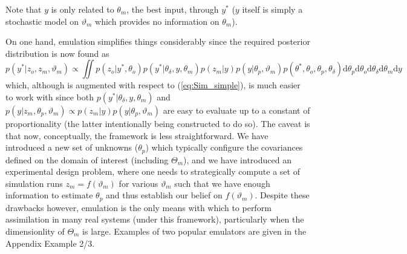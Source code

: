 \documentclass[10pt,a4paper]{article}
\newcommand{\intd} {\textrm{d}}
\begin{document}
\begin{figure}[h!]
\centering
{}
\end{figure}

\noindent Note that $y$ is only related to $\theta_m$, the best input, through $y^*$ ($y$ itself is simply a stochastic model on $\vartheta_m$ which provides no information on $\theta_m$).

On one hand, emulation simplifies things considerably since the required posterior distribution is now found as 
\begin{equation}
p(y^*|z_o,z_m,\vartheta_m) \propto \iint p(z_o | y^*, \theta_o)p(y^* | \theta_\delta, y,\theta_m)p(z_m | y)p(y | \theta_p,\vartheta_m)p(\theta^*,\theta_o, \theta_p, \theta_\delta) \intd \theta_p \intd\theta_o \intd\theta_\delta \intd\theta_m \intd y
\end{equation}
\noindent which, although is augmented with respect to (\ref{eq:Sim_simple}), is much easier to work with since both $p(y^* | \theta_\delta,y,\theta_m)$ and  $p(y | z_m,\theta_p,\vartheta_m) \propto p(z_m | y)p(y | \theta_p,\vartheta_m)$ are easy to evaluate up to a constant of proportionality (the latter intentionally being constructed to do so). The caveat is that now, conceptually, the framework is less straightforward. We have introduced a new set of unknowns ($\theta_p$) which typically configure the covariances defined on the domain of interest (including $\Theta_m$), and we have introduced an experimental design problem, where one needs to strategically compute a set of simulation runs $z_m = f(\vartheta_m)$ for various $\vartheta_m$ such that we have enough information to estimate $\theta_p$ and thus establish our belief on $f(\vartheta_m)$. Despite these drawbacks however, emulation is the only means with which to perform assimilation in many real systems (under this framework), particularly when the dimensionlity of $\Theta_m$ is large. Examples of two popular emulators are given in the Appendix Example 2/3.
\end{document}

